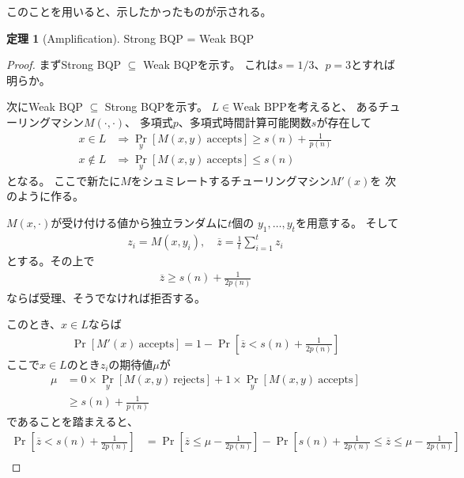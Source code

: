 \documentclass[a4paper, 10pt]{jsarticle}
\theoremstyle{definition}
\newtheorem{thm}{定理}
\begin{document}
このことを用いると、示したかったものが示される。
\begin{screen}
	\begin{thm}[Amplification]\label{thm:Amplification}
		Strong BQP = Weak BQP
	\end{thm}
\end{screen}
\begin{proof}
	まずStrong BQP $\subseteq$ Weak BQPを示す。
	これは$s = 1/3$、$p = 3$とすれば明らか。

	次にWeak BQP $\subseteq$ Strong BQPを示す。
	$L \in \textrm{Weak BPP}$を考えると、
	あるチューリングマシン$M(\cdot, \cdot)$、
	多項式$p$、多項式時間計算可能関数$s$が存在して
	\begin{align}
		x \in L &\Rightarrow \Pr_y \left[ M(x, y) \ \text{accepts} \right]
		\ge s(n) + \frac{1}{p(n)} \\
		x \notin L &\Rightarrow \Pr_y \left[ M(x, y) \ \text{accepts} \right]
		\le s(n)
	\end{align}
	となる。
	ここで新たに$M$をシュミレートするチューリングマシン$M'(x)$を
	次のように作る。
	\begin{screen}
		$M(x, \cdot)$が受け付ける値から独立ランダムに$t$個の
		$y_1, \ldots, y_t$を用意する。
		そして
		\begin{gather}
			z_i = M(x, y_i) , \quad
			\overline{z} = \frac{1}{t} \sum_{i = 1}^t z_i
		\end{gather}
		とする。その上で
		\begin{align}
			\overline{z} \ge s(n) + \frac{1}{2p(n)}
		\end{align}
		ならば受理、そうでなければ拒否する。
	\end{screen}
	このとき、$x \in L$ならば
	\begin{align}
		\Pr \left[ M'(x) \ \text{accepts} \right]
		= 1 - \Pr \left[ \overline{z} < s(n) + \frac{1}{2p(n)} \right]
	\end{align}
	ここで$x \in L$のとき$z_i$の期待値$\mu$が
	\begin{align}
		\mu &= 0 \times \Pr_y \left[ M(x, y) \ \text{rejects} \right]
		+ 1 \times \Pr_y \left[ M(x, y) \ \text{accepts} \right] \\
		&\ge s(n) + \frac{1}{p(n)}
	\end{align}
	であることを踏まえると、
	\begin{align}
		\Pr \left[ \overline{z} < s(n) + \frac{1}{2p(n)} \right]
		&= \Pr \left[ \overline{z} \le \mu - \frac{1}{2p(n)} \right]
		- \Pr \left[ s(n) + \frac{1}{2p(n)} \le \overline{z}
		\le \mu - \frac{1}{2p(n)} \right] \\

\end{align}
\end{proof}
\end{document}
